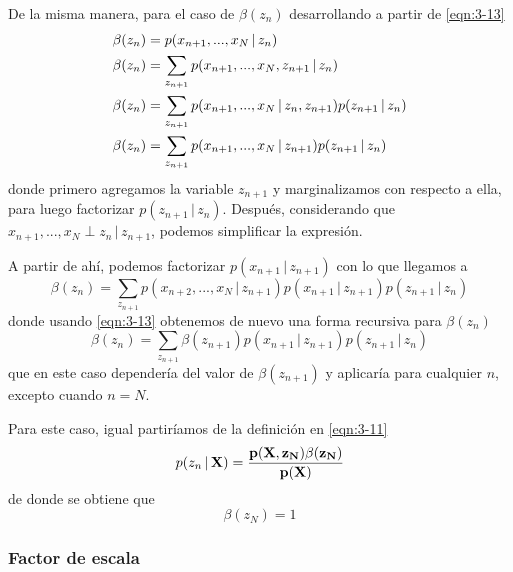 De la misma manera, para el caso de $\beta(z_n)$ desarrollando a partir de  \eqref{eqn:3-13}
\begin{align}
  \beta(z_n) &= p(x_{n+1}, ..., x_N \,|\, z_n)
    \notag \\
  \beta(z_n) &= \sum_{z_{n+1}} p(x_{n+1}, ..., x_N, z_{n+1} \,|\, z_n)
    \notag \\
  \beta(z_n) &= \sum_{z_{n+1}} p(x_{n+1}, ..., x_N \,|\, z_n, z_{n+1}) 
    p(z_{n+1} \,|\, z_n)
    \notag \\
  \beta(z_n) &= \sum_{z_{n+1}} p(x_{n+1}, ..., x_N \,|\, z_{n+1}) 
    p(z_{n+1} \,|\, z_n)  
    \notag 
\end{align}
donde primero agregamos la variable $z_{n+1}$ y marginalizamos con respecto a ella, para luego factorizar $p(z_{n+1} \,|\, z_n)$. Después, considerando que 
$x_{n+1}, ..., x_N \perp z_n \,|\, z_{n+1}$, podemos simplificar la expresión.

A partir de ahí, podemos factorizar $p(x_{n+1} \,|\, z_{n+1})$ con lo que llegamos a 
\begin{equation}  
  \beta(z_n) = \sum_{z_{n+1}} p(x_{n+2}, ..., x_N \,|\, z_{n+1}) 
    p(x_{n+1} \,|\, z_{n+1}) p(z_{n+1} \,|\, z_n)    
    \label{eqn:3-17}
\end{equation}
donde usando \eqref{eqn:3-13} obtenemos de nuevo una forma recursiva para $\beta(z_n)$
\begin{equation}  
  \beta(z_n) = \sum_{z_{n+1}} \beta(z_{n+1})
    p(x_{n+1} \,|\, z_{n+1}) p(z_{n+1} \,|\, z_n)    
    \label{eqn:3-18}
\end{equation}
que en este caso dependería del valor de $\beta(z_{n+1})$ y aplicaría para cualquier $n$, excepto cuando $n = N$. 

Para este caso, igual partiríamos de la definición en \eqref{eqn:3-11}
\begin{equation}
  p(z_n \,|\, \bf{X}) = \frac{p(\bf{X}, z_N) \beta(z_N)} {p(\bf{X})}
  \label{eqn:3-19}
\end{equation}
de donde se obtiene que 
\begin{equation}
  \beta(z_N) = 1
  \label{eqn:3-20}
\end{equation}

\subsubsection{Factor de escala}
\label{sec:escala}

